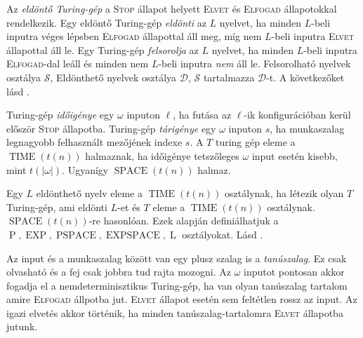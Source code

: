 \documentclass[DIV=15,appendixprefix]{scrreprt}
\theoremstyle{definition}
\theoremstyle{remark}
\DeclareMathOperator{\Pbonya}{P}
\DeclareMathOperator{\EXP}{EXP}
\DeclareMathOperator{\PSPACE}{PSPACE}
\DeclareMathOperator{\EXPSPACE}{EXPSPACE}
\DeclareMathOperator{\Lbonya}{L}
\DeclareMathOperator{\TIME}{TIME}
\DeclareMathOperator{\SPACE}{SPACE}
\begin{document}
Az \emph{eldöntő Turing-gép} a \textsc{Stop} állapot helyett
\textsc{Elvet} és \textsc{Elfogad} állapotokkal rendelkezik. Egy eldöntő Turing-gép \emph{eldönti}
az $L$ nyelvet, ha minden $L$-beli inputra véges lépsben \textsc{Elfogad} állapottal áll meg, míg
nem $L$-beli inputra \textsc{Elvet} állapottal áll le. Egy Turing-gép \emph{felsorolja} az $L$
nyelvet, ha minden $L$-beli inputra \textsc{Elfogad}-dal leáll és minden nem $L$-beli inputra
\emph{nem} áll le. Felsorolható nyelvek osztálya $ \mathcal{ S } $, Eldönthető nyelvek osztálya
$\mathcal{ D }$, $\mathcal{ S }$ tartalmazza $\mathcal{ D }$-t.
%
A következőket lásd
\cite[\href{http://www.math.u-szeged.hu/~hajnal/courses/MSc_Bonyolultsag/ea02.pdf}{
\emph{Bonyolultsági osztályok, Turing-gép fogalmának változatai\ldots}}]{Bonya}.

Turing-gép \emph{időigénye} egy $\omega$ inputon $\ell$, ha futása az $\ell$-ik konfigurációban
kerül először \textsc{Stop} állapotba. Turing-gép \emph{tárigénye} egy $\omega$ inputon $s$, ha
munkaszalag legnagyobb felhasznált mezőjének indexe $s$. A $T$ turing gép eleme a $ \TIME \left( t
\left( n \right) \right) $ halmaznak, ha időigénye tetszőleges $\omega$ input esetén kisebb, mint
$ t \left( \left| \omega \right|  \right)  $. Ugyanígy $ \SPACE \left( t \left( n \right) \right) $
halmaz.

Egy $L$ eldönthető nyelv eleme a $ \TIME \left( t \left( n \right) \right) $ osztálynak, ha létezik
olyan $T$ Turing-gép, ami eldönti $L$-et és $T$ eleme a $ \TIME \left( t \left( n \right) \right) $
osztálynak. $ \SPACE \left( t \left( n \right) \right) $-re hasonlóan. Ezek alapján definiálhatjuk a
$\Pbonya, \EXP, \PSPACE, \EXPSPACE, \Lbonya$ osztályokat.
%
Lásd
\cite[\href{http://www.math.u-szeged.hu/~hajnal/courses/MSc_Bonyolultsag/ea03.pdf}{
\emph{Nem-determinizmus, Bonyolultsági osztályok\ldots}}]{Bonya}.

Az input és a munkaszalag között van egy plusz szalag is a \emph{tanúszalag}. Ez csak olvasható és a
fej csak jobbra tud rajta mozogni. Az $\omega$ inputot pontosan akkor fogadja el a
nemdeterminisztikus Turing-gép, ha van olyan tanúszalag tartalom amire \textsc{Elfogad} állpotba
jut. \textsc{Elvet} állapot esetén sem feltétlen rossz az input. Az igazi elvetés akkor történik, ha
minden tanúszalag-tartalomra \textsc{Elvet} állapotba jutunk.
\end{document}
